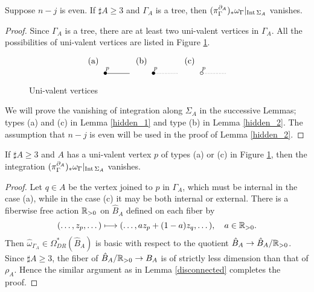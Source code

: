 \begin{prop}\label{vanish_tree}
Suppose $n-j$ is even.
If $\sharp A \ge 3$ and $\Gamma_A$ is a tree, then
$(\pi^{\partial_A}_{\Gamma})_* \omega_{\Gamma}|_{\mathrm{Int}\, \Sigma_A}$ vanishes.
\end{prop}


\begin{proof}
Since $\Gamma_A$ is a tree, there are at least two uni-valent vertices in $\Gamma_A$.
All the possibilities of uni-valent vertices are listed in Figure \ref{types_ends}.
\begin{figure}[htb]%
\[
 \begin{xy}
 (-5,5)*{\text{(a)}},
 (0,0)*{\bullet}="A",
 {\ar@{-}"A";(10,0)^<{p}},
 (15,5)*{\text{(b)}},
 (20,0)*{\bullet}="B",
 {\ar@{.}"B";(30,0)^<{p}},
 (35,5)*{\text{(c)}},
 (40,0)*{\circ}="C",
 {\ar@{.}"C";(50,0)^<{p}}
 \end{xy}
\]
\caption{Uni-valent vertices}\label{types_ends}
\end{figure}
We will prove the vanishing of integration along $\Sigma_A$ in the successive Lemmas;
types (a) and (c) in Lemma \ref{hidden_1} and type (b) in Lemma \ref{hidden_2}.
The assumption that $n-j$ is even will be used in the proof of Lemma \ref{hidden_2}.
\end{proof}


\begin{lem}\label{hidden_1}
If $\sharp A \ge 3$ and $A$ has a uni-valent vertex $p$ of types (a) or (c) in Figure \ref{types_ends}, then the
integration $(\pi^{\partial_A}_{\Gamma})_* \omega_{\Gamma}|_{\mathrm{Int}\, \Sigma_A}$ vanishes.
\end{lem}


\begin{proof}
Let $q \in A$ be the vertex joined to $p$ in $\Gamma_A$, which must be internal in the case (a), while in the case (c)
it may be both internal or external.
There is a fiberwise free action $\mathbb{R}_{>0}$ on $\hat{B}_A$ defined on each fiber by
\[
 (\dots ,z_p , \dots )\longmapsto (\dots ,az_p +(1-a)z_q ,\dots ),\quad a\in \mathbb{R}_{>0}.
\]
Then $\hat{\omega}_{\Gamma_A} \in \Omega^*_{DR}(\hat{B}_A)$ is basic with respect to the quotient
$\hat{B}_A \to \hat{B}_A /\mathbb{R}_{>0}$.
Since $\sharp A \ge 3$, the fiber of $\hat{B}_A / \mathbb{R}_{>0} \to B_A$ is of strictly less dimension than that of
$\rho_A$.
Hence the similar argument as in Lemma \ref{disconnected} completes the proof.
\end{proof}



